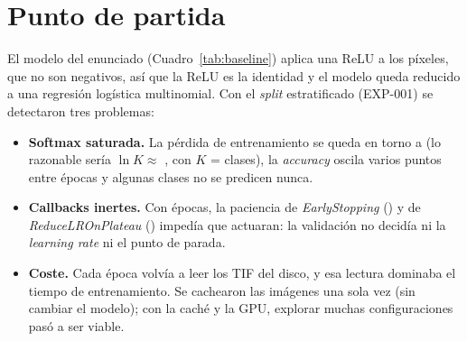 \section{Punto de partida}
El modelo del enunciado (Cuadro~\ref{tab:baseline}) aplica una ReLU a los píxeles, que no son negativos, así que
la ReLU es la identidad y el modelo queda reducido a una regresión logística multinomial. Con el \emph{split}
estratificado (EXP-001) se detectaron tres problemas:
\begin{itemize}
  \item \textbf{Softmax saturada.} La pérdida de entrenamiento se queda en torno a  (lo
  razonable sería $\ln K \approx$ , con $K$ =  clases), la \emph{accuracy} oscila
  varios puntos entre épocas y algunas clases no se predicen nunca.
  \item \textbf{Callbacks inertes.} Con  épocas, la paciencia de \emph{EarlyStopping}
  () y de \emph{ReduceLROnPlateau} () impedía que actuaran: la
  validación no decidía ni la \emph{learning rate} ni el punto de parada.
  \item \textbf{Coste.} Cada época volvía a leer los TIF del disco, y esa lectura dominaba el tiempo de
  entrenamiento. Se cachearon las imágenes una sola vez (sin cambiar el modelo); con la caché y la GPU, explorar
  muchas configuraciones pasó a ser viable.
\end{itemize}

\begin{table}[h]
  \centering
  \caption{Modelo de partida y sus métricas de validación (EXP-001).}
  \label{tab:baseline}
\end{table}

